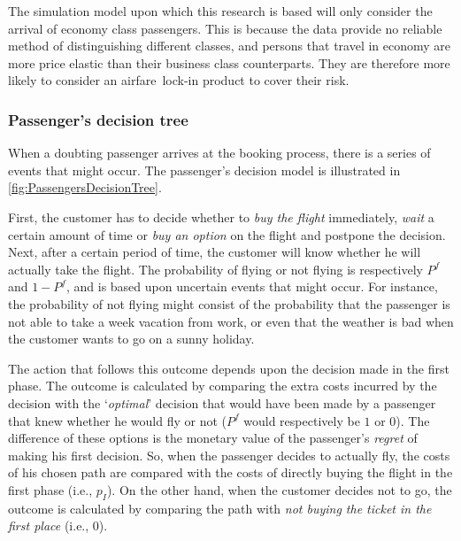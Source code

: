 The simulation model upon which this research is based will only consider the arrival of economy class passengers. This is because the data provide no reliable method of distinguishing different classes, and persons that travel in economy are more price elastic than their business class counterparts. They are therefore more likely to consider an airfare~lock-in product to cover their risk.

\subsubsection{Passenger's decision tree}
When a doubting passenger arrives at the booking process, there is a series of events that might occur. The passenger's decision model is illustrated in \autoref{fig:PassengersDecisionTree}.


First, the customer has to decide whether to \emph{buy the flight} immediately, \emph{wait} a certain amount of time or \emph{buy an option} on the flight and postpone the decision. Next, after a certain period of time, the customer will know whether he will actually take the flight. The probability of flying or not flying is respectively $P^f$ and $1 - P^f$, and is based upon uncertain events that might occur. For instance, the probability of not flying might consist of the probability that the passenger is not able to take a week vacation from work, or even that the weather is bad when the customer wants to go on a sunny holiday.

The action that follows this outcome depends upon the decision made in the first phase. The outcome is calculated by comparing the extra costs incurred by the decision with the `\emph{optimal}' decision that would have been made by a passenger that knew whether he would fly or not ($P^f$ would respectively be $1$ or $0$). The difference of these options is the monetary value of the passenger's \emph{regret} of making his first decision. So, when the passenger decides to actually fly, the costs of his chosen path are compared with the costs of directly buying the flight in the first phase (i.e., $p_I$). On the other hand, when the customer decides not to go, the outcome is calculated by comparing the path with \emph{not buying the ticket in the first place} (i.e., $0$).

